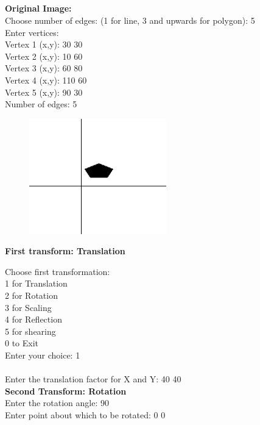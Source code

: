 \documentclass[9pt,letterpaper]{article}
\begin{document}
\subsection*{}
\textbf{Original Image:}\\
Choose number of edges: (1 for line, 3 and upwards for polygon): 5\\
Enter vertices:\\ 
Vertex 1 (x,y): 30 30\\
Vertex 2 (x,y): 10 60\\
Vertex 3 (x,y): 60 80\\
Vertex 4 (x,y): 110 60\\
Vertex 5 (x,y): 90 30\\
Number of edges: 5\\
\begin{figure}[h]
    \centering
    \includegraphics[height=5cm]{CompositeTransformations/Outputs/Original.png}
\end{figure}

\newpage
\textbf{\Large{First transform: Translation}}

Choose first transformation: \\
1 for Translation\\
2 for Rotation\\
3 for Scaling\\
4 for Reflection\\
5 for shearing\\
0 to Exit\\
Enter your choice: 1\\
\\
Enter the translation factor for X and Y: 40 40\\


\textbf{\large{Second Transform: Rotation}}\\
Enter the rotation angle: 90   \\
Enter point about which to be rotated: 0 0\\
\end{document}
